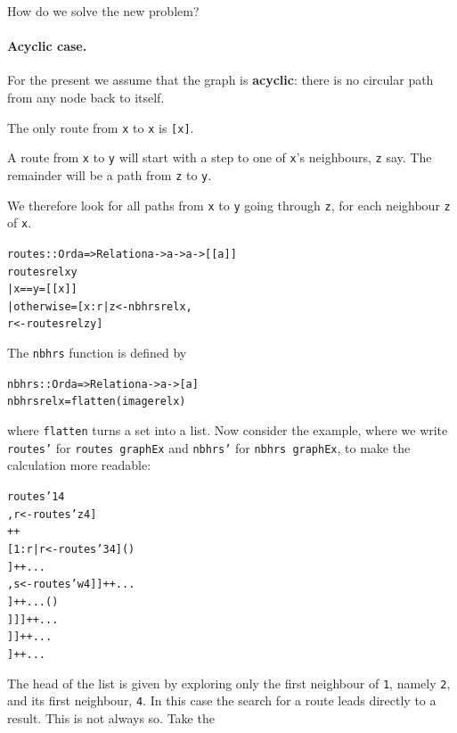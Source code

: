 \begin{example}
How do we solve the new problem? 


\paragraph{Acyclic case.}

For the present
we assume that the graph is \textbf{acyclic}: there is no circular path from
any node back to itself.

\begin{titemize} 
\item The only route from \texttt{x} to \texttt{x} is \texttt{[x]}.
\item A route from \texttt{x} to \texttt{y} will start with a step to one of 
\texttt{x}'s neighbours, \texttt{z} say. The remainder will be a path from
\texttt{z} to \texttt{y}.
\end{titemize}
We therefore look for all paths from \texttt{x} to \texttt{y} going through 
\texttt{z}, for each neighbour \texttt{z} of \texttt{x}.
\begin{alltt}
routes :: Ord a => Relation a -> a -> a -> [[a]]
routes rel x y
  | x==y        = [[x]]
  | otherwise   = [ x:r | z <- nbhrs rel x ,
                          r <- routes rel z y ]
\end{alltt}
The \texttt{nbhrs} function is defined by
\begin{alltt}
nbhrs :: Ord a => Relation a -> a -> [a]
nbhrs rel x = flatten (image rel x)
\end{alltt} 
where \texttt{flatten} turns a set into a list.
Now consider the example, where we write \texttt{routes'} for \texttt{routes
graphEx} and \texttt{nbhrs'} for \texttt{nbhrs graphEx},
to make the calculation more readable:
\begin{alltt}
routes' 1 4
\step [ 1:r | z <- [2,3] , r <- routes' z 4 ]
\step [ 1:r | r <- routes' 2 4 ] ++ 
    [ 1:r | r <- routes' 3 4 ]\hfill (\dag)
\step [ 1:r | r <- [ 2:s | w <- nbhrs' 2 , s <- routes' w 4 ]]++...
\step [ 1:r | r <- [ 2:s | w <- [4] , s <- routes' w 4 ] ] ++ ...
\step [ 1:r | r <- [ 2:s | s <- routes' 4 4 ] ] ++ ...\hfill (\ddag)
\step [ 1:r | r <- [ 2:s | s <- [[4]] ] ] ++ ...
\step [ 1:r | r <- [ [2,4] ] ] ++ ...
\step [[1,2,4]] ++ ...
\end{alltt}
The head of the list is given by exploring only the first neighbour of 
\texttt{1}, namely \texttt{2}, and its first neighbour, \texttt{4}. In this case 
the search
for a route leads directly to a result. This is not always so. Take the

\end{example}
